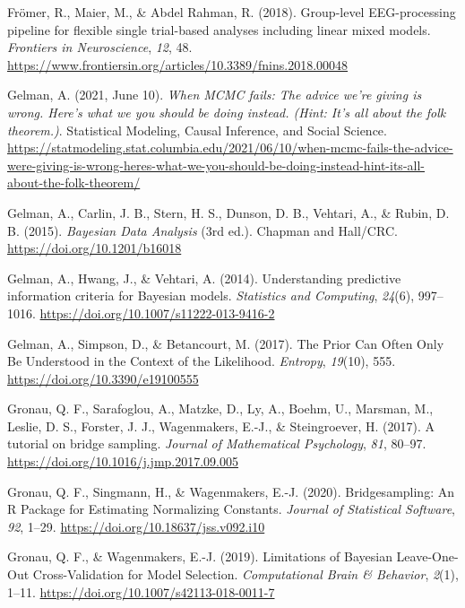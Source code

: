 \documentclass[
  doc,12pt,floatsintext]{apa7}
\newlength{\cslhangindent}
\newenvironment{CSLReferences}[2] %
 {\begin{list}{}{%
  \setlength{\itemindent}{0pt}
  \setlength{\leftmargin}{0pt}
  \setlength{\parsep}{0pt}
  \ifodd #1
   \setlength{\leftmargin}{\cslhangindent}
   \setlength{\itemindent}{-1\cslhangindent}
  \fi
  \setlength{\itemsep}{#2\baselineskip}}}
 {\end{list}}
\begin{document}
\begin{CSLReferences}{1}{0}
Frömer, R., Maier, M., \& Abdel Rahman, R. (2018). Group-level {EEG-processing} pipeline for flexible single trial-based analyses including linear mixed models. \emph{Frontiers in Neuroscience}, \emph{12}, 48. \url{https://www.frontiersin.org/articles/10.3389/fnins.2018.00048}

Gelman, A. (2021, June 10). \emph{When {MCMC} fails: {The} advice we're giving is wrong. {Here}'s what we you should be doing instead. ({Hint}: It's all about the folk theorem.)}. Statistical Modeling, Causal Inference, and Social Science. \url{https://statmodeling.stat.columbia.edu/2021/06/10/when-mcmc-fails-the-advice-were-giving-is-wrong-heres-what-we-you-should-be-doing-instead-hint-its-all-about-the-folk-theorem/}

Gelman, A., Carlin, J. B., Stern, H. S., Dunson, D. B., Vehtari, A., \& Rubin, D. B. (2015). \emph{Bayesian {Data Analysis}} (3rd ed.). {Chapman and Hall/CRC}. \url{https://doi.org/10.1201/b16018}

Gelman, A., Hwang, J., \& Vehtari, A. (2014). Understanding predictive information criteria for {Bayesian} models. \emph{Statistics and Computing}, \emph{24}(6), 997--1016. \url{https://doi.org/10.1007/s11222-013-9416-2}

Gelman, A., Simpson, D., \& Betancourt, M. (2017). The {Prior Can Often Only Be Understood} in the {Context} of the {Likelihood}. \emph{Entropy}, \emph{19}(10), 555. \url{https://doi.org/10.3390/e19100555}

Gronau, Q. F., Sarafoglou, A., Matzke, D., Ly, A., Boehm, U., Marsman, M., Leslie, D. S., Forster, J. J., Wagenmakers, E.-J., \& Steingroever, H. (2017). A tutorial on bridge sampling. \emph{Journal of Mathematical Psychology}, \emph{81}, 80--97. \url{https://doi.org/10.1016/j.jmp.2017.09.005}

Gronau, Q. F., Singmann, H., \& Wagenmakers, E.-J. (2020). Bridgesampling: {An R Package} for {Estimating Normalizing Constants}. \emph{Journal of Statistical Software}, \emph{92}, 1--29. \url{https://doi.org/10.18637/jss.v092.i10}

Gronau, Q. F., \& Wagenmakers, E.-J. (2019). Limitations of {Bayesian Leave-One-Out Cross-Validation} for {Model Selection}. \emph{Computational Brain \& Behavior}, \emph{2}(1), 1--11. \url{https://doi.org/10.1007/s42113-018-0011-7}


\end{CSLReferences}
\end{document}
